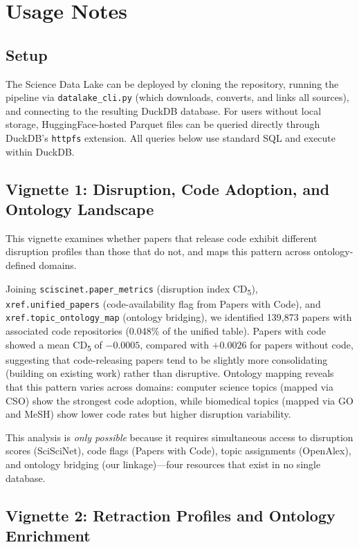 \section{Usage Notes}
\label{sec:usage}

\subsection{Setup}

The Science Data Lake can be deployed by cloning the repository, running the
pipeline via \texttt{datalake\_cli.py} (which downloads, converts, and links
all sources), and connecting to the resulting DuckDB database. For users
without local storage, HuggingFace-hosted Parquet files can be queried
directly through DuckDB's \texttt{httpfs} extension. All queries below use
standard SQL and execute within DuckDB.

\subsection{Vignette 1: Disruption, Code Adoption, and Ontology Landscape}

This vignette examines whether papers that release code exhibit different
disruption profiles than those that do not, and maps this pattern across
ontology-defined domains.

Joining \texttt{sciscinet.paper\_metrics} (disruption index
CD\textsubscript{5}), \texttt{xref.unified\_papers} (code-availability flag
from Papers with Code), and \texttt{xref.topic\_ontology\_map} (ontology
bridging), we identified 139,873 papers with associated code repositories
(0.048\% of the unified table). Papers with code showed a mean
CD\textsubscript{5} of $-0.0005$, compared with $+0.0026$ for papers
without code, suggesting that code-releasing papers tend to be slightly more
consolidating (building on existing work) rather than disruptive. Ontology
mapping reveals that this pattern varies across domains: computer science
topics (mapped via CSO) show the strongest code adoption, while biomedical
topics (mapped via GO and MeSH) show lower code rates but higher disruption
variability.

This analysis is \emph{only possible} because it requires simultaneous access
to disruption scores (SciSciNet), code flags (Papers with Code), topic
assignments (OpenAlex), and ontology bridging (our linkage)---four resources
that exist in no single database.

\subsection{Vignette 2: Retraction Profiles and Ontology Enrichment}

